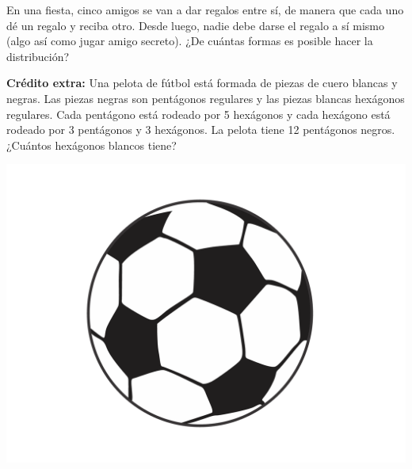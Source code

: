 \documentclass[12pt]{article}
\begin{document}
\begin{problema}
    En una fiesta, cinco amigos se van a dar regalos entre sí, de manera que cada uno dé un regalo y reciba otro. Desde luego, nadie debe darse el regalo a sí mismo (algo así como jugar amigo secreto). ¿De cuántas formas es posible hacer la distribución?
\end{problema}

\textbf{Crédito extra:} Una pelota de fútbol está formada de piezas de cuero blancas y negras. Las piezas negras son pentágonos regulares y las piezas blancas hexágonos regulares. Cada pentágono está rodeado por 5 hexágonos y cada hexágono está rodeado por 3 pentágonos y 3 hexágonos. La pelota tiene 12 pentágonos negros. ¿Cuántos hexágonos blancos tiene?

\begin{center}
    \includegraphics[scale=0.2]{Imagenes/IMG7/Pelota.png}
\end{center}
\end{document}
